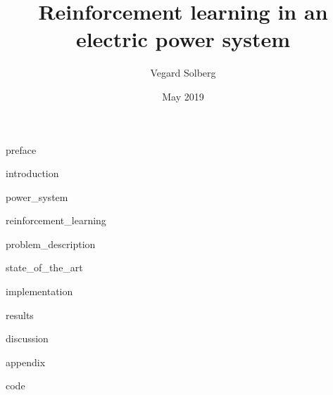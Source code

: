 \documentclass{book}
\title{Reinforcement learning in an electric power system}
\author{Vegard Solberg}
\date{May 2019}
\begin{document}
    \frontmatter
    {preface}
    
    \tableofcontents
    
    \mainmatter
    {introduction}
    
    {power_system}
 
    {reinforcement_learning}
    
    {problem_description}
    
    {state_of_the_art}
    
    {implementation}
    
    
    {results}
    
    {discussion}
    \printbibliography

    \appendix
    {appendix}
    
    {code}
    
\end{document}
